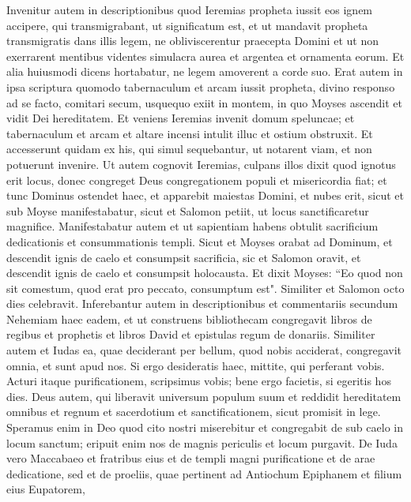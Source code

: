 \begin{biblechapter}  
\verse Invenitur autem in descriptionibus quod Ieremias propheta iussit eos ignem accipere, qui transmigrabant, ut significatum est, 
\verse et ut mandavit propheta transmigratis dans illis legem, ne obliviscerentur praecepta Domini et ut non exerrarent mentibus videntes simulacra aurea et argentea et ornamenta eorum. 
\verse Et alia huiusmodi dicens hortabatur, ne legem amoverent a corde suo. 
\verse Erat autem in ipsa scriptura quomodo tabernaculum et arcam iussit propheta, divino responso ad se facto, comitari secum, usquequo exiit in montem, in quo Moyses ascendit et vidit Dei hereditatem. 
\verse Et veniens Ieremias invenit domum speluncae; et tabernaculum et arcam et altare incensi intulit illuc et ostium obstruxit. 
\verse Et accesserunt quidam ex his, qui simul sequebantur, ut notarent viam, et non potuerunt invenire. 
\verse Ut autem cognovit Ieremias, culpans illos dixit quod ignotus erit locus, donec congreget Deus congregationem populi et misericordia fiat; 
\verse et tunc Dominus ostendet haec, et apparebit maiestas Domini, et nubes erit, sicut et sub Moyse manifestabatur, sicut et Salomon petiit, ut locus sanctificaretur magnifice.  
\verse Manifestabatur autem et ut sapientiam habens obtulit sacrificium dedicationis et consummationis templi. 
\verse Sicut et Moyses orabat ad Dominum, et descendit ignis de caelo et consumpsit sacrificia, sic et Salomon oravit, et descendit ignis de caelo et consumpsit holocausta. 
\verse Et dixit Moyses: “Eo quod non sit comestum, quod erat pro peccato, consumptum est". 
\verse Similiter et Salomon octo dies celebravit. 
\verse Inferebantur autem in descriptionibus et commentariis secundum Nehemiam haec eadem, et ut construens bibliothecam congregavit libros de regibus et prophetis et libros David et epistulas regum de donariis. 
\verse Similiter autem et Iudas ea, quae deciderant per bellum, quod nobis acciderat, congregavit omnia, et sunt apud nos. 
\verse Si ergo desideratis haec, mittite, qui perferant vobis. 
\verse Acturi itaque purificationem, scripsimus vobis; bene ergo facietis, si egeritis hos dies. 
\verse Deus autem, qui liberavit universum populum suum et reddidit hereditatem omnibus et regnum et sacerdotium et sanctificationem,  
\verse sicut promisit in lege. Speramus enim in Deo quod cito nostri miserebitur et congregabit de sub caelo in locum sanctum; eripuit enim nos de magnis periculis et locum purgavit. 
\verse De Iuda vero Maccabaeo et fratribus eius et de templi magni purificatione et de arae dedicatione, 
\verse sed et de proeliis, quae pertinent ad Antiochum Epiphanem et filium eius Eupatorem, 

\end{biblechapter}
